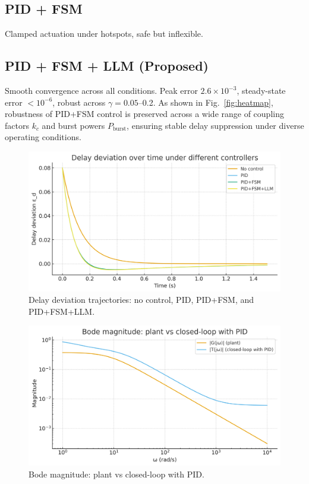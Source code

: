 \documentclass[conference]{IEEEtran}
\begin{document}
\subsection{PID + FSM}
Clamped actuation under hotspots, safe but inflexible.  

\subsection{PID + FSM + LLM (Proposed)}
Smooth convergence across all conditions. Peak error $2.6 \times 10^{-3}$, steady-state error $<10^{-6}$, robust across $\gamma=0.05$--0.2.  
As shown in Fig.~\ref{fig:heatmap}, robustness of PID+FSM control is preserved across a wide range of coupling factors $k_c$ and burst powers $P_{\text{burst}}$, ensuring stable delay suppression under diverse operating conditions.  

\begin{figure}[h]
\centering
\includegraphics[width=0.9\columnwidth]{fig2_time_response.png}
\caption{Delay deviation trajectories: no control, PID, PID+FSM, and PID+FSM+LLM.}
\label{fig:time}
\end{figure}

\begin{figure}[h]
\centering
\includegraphics[width=0.9\columnwidth]{fig3_bode_magnitude.png}
\caption{Bode magnitude: plant vs closed-loop with PID.}
\label{fig:bode}
\end{figure}
\end{document}
